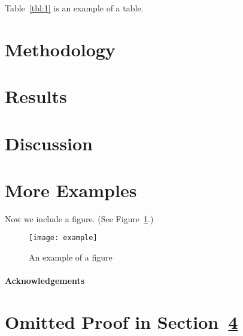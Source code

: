 Table~\ref*{tbl:1} is an example of a table.


\section{Methodology}
\label{sec:methods}

\section{Results}
\label{sec:results}

\section{Discussion}
\label{sec:discuss}

\section{More Examples}
\label{sec:examples}

Now we include a figure.
(See Figure~\ref{fig:example}.)
\begin{figure}[ht]
	\centering
	\texttt{[image: example]}
	\caption{An example of a figure}
	\label{fig:example}
\end{figure}

\paragraph{Acknowledgements} \lipsum[6]



\appendix

\section{Omitted Proof in Section~\ref{sec:examples}}
\label{app:1}

\lipsum[7]